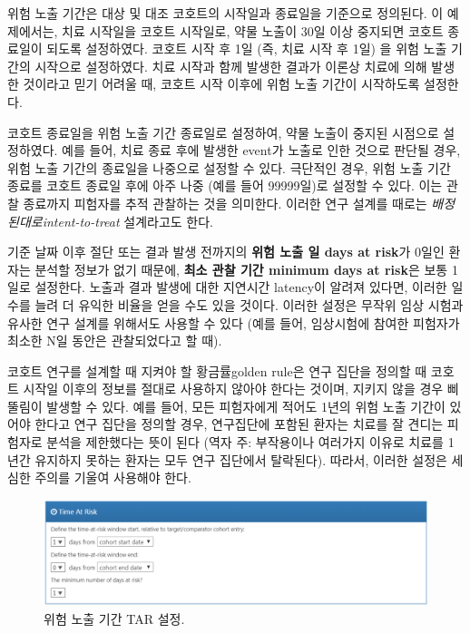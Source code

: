 \documentclass[10.5pt]{book}
\theoremstyle{definition}
\theoremstyle{definition}
\theoremstyle{definition}
\theoremstyle{remark}
\let\BeginKnitrBlock\begin \let\EndKnitrBlock\end
\begin{document}
위험 노출 기간은 대상 및 대조 코호트의 시작일과 종료일을 기준으로
정의된다. 이 예제에서는, 치료 시작일을 코호트 시작일로, 약물 노출이 30일
이상 중지되면 코호트 종료일이 되도록 설정하였다. 코호트 시작 후 1일 (즉,
치료 시작 후 1일) 을 위험 노출 기간의 시작으로 설정하였다. 치료 시작과
함께 발생한 결과가 이론상 치료에 의해 발생한 것이라고 믿기 어려울 때,
코호트 시작 이후에 위험 노출 기간이 시작하도록 설정한다.

코호트 종료일을 위험 노출 기간 종료일로 설정하여, 약물 노출이 중지된
시점으로 설정하였다. 예를 들어, 치료 종료 후에 발생한 event가 노출로
인한 것으로 판단될 경우, 위험 노출 기간의 종료일을 나중으로 설정할 수
있다. 극단적인 경우, 위험 노출 기간 종료를 코호트 종료일 후에 아주 나중
(예를 들어 99999일)로 설정할 수 있다. 이는 관찰 종료까지 피험자를 추적
관찰하는 것을 의미한다. 이러한 연구 설계를 때로는
\emph{배정된대로intent-to-treat} 설계라고도 한다.

기준 날짜 이후 절단 또는 결과 발생 전까지의 \textbf{위험 노출 일 days at
risk}가 0일인 환자는 분석할 정보가 없기 때문에, \textbf{최소 관찰 기간
minimum days at risk}은 보통 1일로 설정한다. 노출과 결과 발생에 대한
지연시간 latency이 알려져 있다면, 이러한 일수를 늘려 더 유익한 비율을
얻을 수도 있을 것이다. 이러한 설정은 무작위 임상 시험과 유사한 연구
설계를 위해서도 사용할 수 있다 (예를 들어, 임상시험에 참여한 피험자가
최소한 N일 동안은 관찰되었다고 할 때).

\BeginKnitrBlock{rmdimportant}
코호트 연구를 설계할 때 지켜야 할 황금률golden rule은 연구 집단을 정의할
때 코호트 시작일 이후의 정보를 절대로 사용하지 않아야 한다는 것이며,
지키지 않을 경우 삐뚤림이 발생할 수 있다. 예를 들어, 모든 피험자에게
적어도 1년의 위험 노출 기간이 있어야 한다고 연구 집단을 정의할 경우,
연구집단에 포함된 환자는 치료를 잘 견디는 피험자로 분석을 제한했다는
뜻이 된다 (역자 주: 부작용이나 여러가지 이유로 치료를 1년간 유지하지
못하는 환자는 모두 연구 집단에서 탈락된다). 따라서, 이러한 설정은 세심한
주의를 기울여 사용해야 한다.
\EndKnitrBlock{rmdimportant}

\begin{figure}

{\centering \includegraphics[width=1\linewidth]{images/PopulationLevelEstimation/timeAtRisk} 

}

\caption{위험 노출 기간 TAR 설정.}\label{fig:timeAtRisk}
\end{figure}
\end{document}
